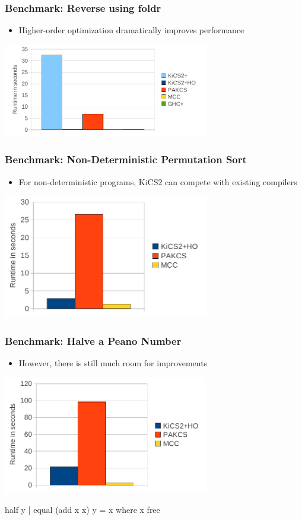 \documentclass[utf8]{beamer}
\newenvironment{program}{\begin{semiverbatim}\small}{\end{semiverbatim}}
\begin{document}
\begin{frame}
\frametitle{Benchmark: Reverse using foldr}
\begin{itemize}
\item Higher-order optimization dramatically improves performance
\end{itemize}
\begin{center}
\includegraphics[width=9cm]{gfx/reverseho}
\end{center}
\end{frame}

\begin{frame}
\frametitle{Benchmark: Non-Deterministic Permutation Sort}
\begin{itemize}
\item For non-deterministic programs, KiCS2 can compete with existing compilers
\end{itemize}
\begin{center}
\includegraphics[width=9cm]{gfx/permsort}
\end{center}
\end{frame}

\begin{frame}[fragile]
\frametitle{Benchmark: Halve a Peano Number}
\begin{itemize}
\item However, there is still much room for improvements
\end{itemize}
\begin{center}
\includegraphics[width=9cm]{gfx/half}
\begin{program}
        half y | equal (add x x) y = x where x free
\end{program}
\end{center}
\end{frame}
\end{document}
